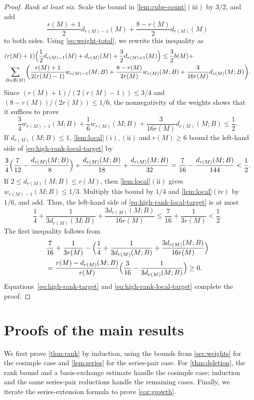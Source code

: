\documentclass[11pt]{article}
\numberwithin{equation}{section}
\newcommand{\BB}{\mathcal B}
\newcommand{\wloc}[1]{w_{#1}(M;B)}
\newcommand{\dloc}[1]{d_{#1}(M;B)}
\begin{document}
\begin{proof}
\emph{Rank at least six.}
Scale the bound in \autoref{lem:cube-count}\(\mathrm{(iii)}\)
by \(3/2\), and add
\[
 \frac{r(M)+1}2d_{r(M)-1}(M)+\frac{8-r(M)}2d_{r(M)}(M)
\]
to both sides.
Using \eqref{eq:weight-total}, we rewrite this inequality as
\begin{align}
 &(r(M)+1)\Bigl(\frac12d_{r(M)-1}(M)+d_{r(M)}(M)+\frac32d_{r(M)+1}(M)\Bigr)\le\frac32b(M)+\notag\\
 &\sum_{B\in\BB(M)}\biggl(\frac{r(M)+1}{2(r(M)-1)}\wloc{r(M)-1}+\frac{8-r(M)}{2r(M)}\wloc{r(M)}+\frac3{16r(M)}\dloc{r(M)}\biggr).
 \label{eq:high-rank-target}
\end{align}
Since \((r(M)+1)/(2(r(M)-1))\le3/4\) and
\((8-r(M))/(2r(M))\le1/6\), the nonnegativity of the weights
shows that it suffices to prove
\begin{equation}\label{eq:high-rank-local-target}
 \frac34\wloc{r(M)-1}+\frac16\wloc{r(M)}
 +\frac3{16r(M)}\dloc{r(M)}\le\frac12.
\end{equation}
If \(\dloc{r(M)}\le1\), \autoref{lem:local}\(\mathrm{(i),(ii)}\)
and \(r(M)\ge6\)
bound the left-hand side of
\eqref{eq:high-rank-local-target} by
\[
 \frac34\Bigl(\frac7{12}-\frac{\dloc{r(M)}}8\Bigr)
 +\frac{\dloc{r(M)}}{18}+\frac{\dloc{r(M)}}{32}
 =\frac7{16}-\frac{\dloc{r(M)}}{144}<\frac12.
\]
If \(2\le\dloc{r(M)}\le r(M)\), then
\autoref{lem:local}\(\mathrm{(ii)}\) gives
\(\wloc{r(M)-1}\le1/3\).
Multiply this bound by \(1/4\) and
\autoref{lem:local}\(\mathrm{(iv)}\) by \(1/6\), and add.
Thus, the left-hand side of \eqref{eq:high-rank-local-target} is at most
\[
 \frac14+\frac1{3\dloc{r(M)}}+\frac{3\dloc{r(M)}}{16r(M)}
 \le\frac7{16}+\frac1{3r(M)}<\frac12.
\]
The first inequality follows from
\begin{align*}
 &\frac7{16}+\frac1{3r(M)}-\Bigl(\frac14+\frac1{3\dloc{r(M)}}+\frac{3\dloc{r(M)}}{16r(M)}\Bigr)\\
 &=\frac{r(M)-\dloc{r(M)}}{r(M)}\Bigl(\frac3{16}-\frac1{3\dloc{r(M)}}\Bigr)\ge0.
\end{align*}
Equations~\eqref{eq:high-rank-target} and
\eqref{eq:high-rank-local-target} complete the proof.
\end{proof}

\section{Proofs of the main results}\label{sec:proofs}

We first prove \autoref{thm:rank} by induction, using the bounds from
\autoref{sec:weights} for the cosimple case and \autoref{lem:series} for
the series-pair case. For \autoref{thm:deletion}, the rank bound and a
basis-exchange estimate handle the cosimple case; induction and the same
series-pair reductions handle the remaining cases. Finally, we iterate
the series-extension formula to prove \autoref{cor:growth}.
\end{document}
